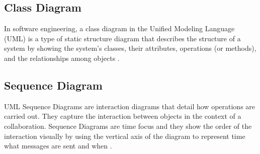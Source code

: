 \documentclass[12pt]{report}
\begin{document}
\newpage
\subsection{Class Diagram}
In software engineering, a class diagram in the Unified Modeling Language (UML) is a type of static structure diagram that describes the structure of a system by showing the system's classes, their attributes, operations (or methods), and the relationships among objects \cite{paradigm_2018_uml}.

\newpage
\subsection{Sequence Diagram}
UML Sequence Diagrams are interaction diagrams that detail how operations are carried out. They capture the interaction between objects in the context of a collaboration. Sequence Diagrams are time focus and they show the order of the interaction visually by using the vertical axis of the diagram to represent time what messages are sent and when \cite{paradigm_2018_uml}.



\singlespacing
\printbibliography[title={References}]
\end{document}
